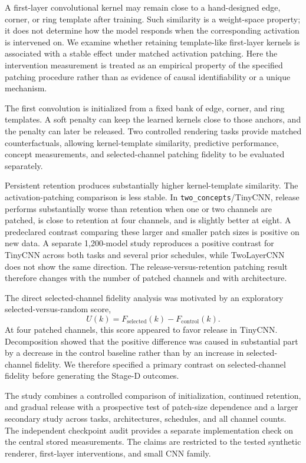 \documentclass[10pt]{article}
\begin{document}
A first-layer convolutional kernel may remain close to a hand-designed edge, corner, or ring template after training. Such similarity is a weight-space property; it does not determine how the model responds when the corresponding activation is intervened on. We examine whether retaining template-like first-layer kernels is associated with a stable effect under matched activation patching. Here the intervention measurement is treated as an empirical property of the specified patching procedure rather than as evidence of causal identifiability or a unique mechanism.

The first convolution is initialized from a fixed bank of edge, corner, and ring templates. A soft penalty can keep the learned kernels close to those anchors, and the penalty can later be released. Two controlled rendering tasks provide matched counterfactuals, allowing kernel-template similarity, predictive performance, concept measurements, and selected-channel patching fidelity to be evaluated separately.

Persistent retention produces substantially higher kernel-template similarity. The activation-patching comparison is less stable. In \texttt{two\_concepts}/TinyCNN, release performs substantially worse than retention when one or two channels are patched, is close to retention at four channels, and is slightly better at eight. A predeclared contrast comparing these larger and smaller patch sizes is positive on new data. A separate 1,200-model study reproduces a positive contrast for TinyCNN across both tasks and several prior schedules, while TwoLayerCNN does not show the same direction. The release-versus-retention patching result therefore changes with the number of patched channels and with architecture.

The direct selected-channel fidelity analysis was motivated by an exploratory selected-versus-random score,
\[
U(k)=F_{\mathrm{selected}}(k)-F_{\mathrm{control}}(k).
\]
At four patched channels, this score appeared to favor release in TinyCNN. Decomposition showed that the positive difference was caused in substantial part by a decrease in the control baseline rather than by an increase in selected-channel fidelity. We therefore specified a primary contrast on selected-channel fidelity before generating the Stage-D outcomes.

The study combines a controlled comparison of initialization, continued retention, and gradual release with a prospective test of patch-size dependence and a larger secondary study across tasks, architectures, schedules, and all channel counts. The independent checkpoint audit provides a separate implementation check on the central stored measurements. The claims are restricted to the tested synthetic renderer, first-layer interventions, and small CNN family.
\end{document}
